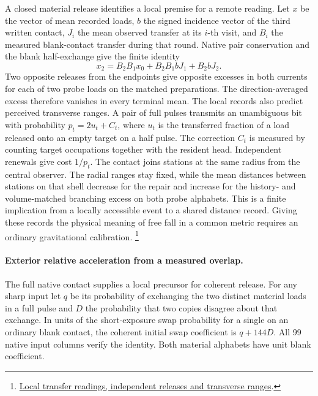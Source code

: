 \documentclass[11pt]{article}
\begin{document}
A closed material release identifies a local premise for a remote
reading. Let \(x\) be the vector of mean recorded loads, \(b\) the
signed incidence vector of the third written contact, \(J_i\) the
mean observed transfer at its \(i\)-th visit, and \(B_i\) the
measured blank-contact transfer during that round. Native pair
conservation and the blank half-exchange give the finite identity
\[
x_2=B_2 B_1 x_0+B_2 B_1 b J_1+B_2 b J_2 .
\]
Two opposite releases from the endpoints give opposite excesses in
both currents for each of two probe loads on the matched preparations.
The direction-averaged excess therefore vanishes in every terminal
mean. The local records also predict perceived transverse ranges.
A pair of full pulses transmits an unambiguous bit with probability
\(p_t=2u_t+C_t\), where \(u_t\) is the transferred fraction of a
load released onto an empty target on a half pulse. The correction
\(C_t\) is measured by counting target occupations together with
the resident head. Independent renewals give cost \(1/p_t\).
The contact joins stations at the same radius from the central
observer. The radial ranges stay fixed, while the mean distances
between stations on that shell decrease for the repair and increase
for the history- and volume-matched branching excess on both probe
alphabets. This is a finite implication from a locally accessible
event to a shared distance record. Giving these records the physical
meaning of free fall in a common metric requires an ordinary
gravitational calibration.%
\footnote{\href{https://github.com/FloatingPragma/observer-patch-holography/blob/main/model/experiments/interval_echo_shell_flux/product_address/green_response/material_recoil/overlap_source/native_boundary/stock/aperture/MOVING_RESULTS.md}{Local transfer readings, independent releases and transverse ranges}.}

\paragraph{Exterior relative acceleration from a measured overlap.}
The full native contact supplies a local precursor for coherent
release. For any sharp input let \(q\) be its probability of exchanging
the two distinct material loads in a full pulse and \(D\) the
probability that two copies disagree about that exchange. In units of
the short-exposure swap probability for a single on an ordinary
blank contact, the coherent initial swap coefficient is \(q+144D\).
All 99 native input columns verify the identity.
Both material alphabets have unit blank coefficient.
\end{document}
